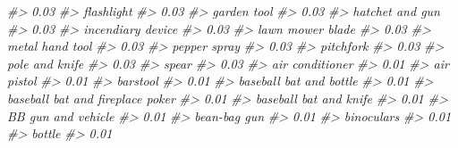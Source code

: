 \documentclass[
]{krantz}
\makeatletter
\newenvironment{Shaded}{\begin{snugshade}}{\end{snugshade}}
\newcommand{\CommentTok}[1]{\textcolor[rgb]{0.37,0.37,0.37}{\textit{#1}}}
\newenvironment{kframe}{%
\medskip{}
\setlength{\fboxsep}{.8em}
 \def\at@end@of@kframe{}%
 \ifinner\ifhmode%
  \def\at@end@of@kframe{\end{minipage}}%
  \begin{minipage}{\columnwidth}%
 \fi\fi%
 \def\FrameCommand##1{\hskip\@totalleftmargin \hskip-\fboxsep
 \colorbox{shadecolor}{##1}\hskip-\fboxsep
     \hskip-\linewidth \hskip-\@totalleftmargin \hskip\columnwidth}%
 \MakeFramed {\advance\hsize-\width
   \@totalleftmargin\z@ \linewidth\hsize
   \@setminipage}}%
 {\par\unskip\endMakeFramed%
 \at@end@of@kframe}
\renewenvironment{Shaded}{\begin{kframe}}{\end{kframe}}
\makeatother
\begin{document}
\begin{Shaded}
\begin{Highlighting}[]
\CommentTok{\#\textgreater{}                             0.03 }
\CommentTok{\#\textgreater{}                       flashlight }
\CommentTok{\#\textgreater{}                             0.03 }
\CommentTok{\#\textgreater{}                      garden tool }
\CommentTok{\#\textgreater{}                             0.03 }
\CommentTok{\#\textgreater{}                  hatchet and gun }
\CommentTok{\#\textgreater{}                             0.03 }
\CommentTok{\#\textgreater{}                incendiary device }
\CommentTok{\#\textgreater{}                             0.03 }
\CommentTok{\#\textgreater{}                 lawn mower blade }
\CommentTok{\#\textgreater{}                             0.03 }
\CommentTok{\#\textgreater{}                  metal hand tool }
\CommentTok{\#\textgreater{}                             0.03 }
\CommentTok{\#\textgreater{}                     pepper spray }
\CommentTok{\#\textgreater{}                             0.03 }
\CommentTok{\#\textgreater{}                        pitchfork }
\CommentTok{\#\textgreater{}                             0.03 }
\CommentTok{\#\textgreater{}                   pole and knife }
\CommentTok{\#\textgreater{}                             0.03 }
\CommentTok{\#\textgreater{}                            spear }
\CommentTok{\#\textgreater{}                             0.03 }
\CommentTok{\#\textgreater{}                  air conditioner }
\CommentTok{\#\textgreater{}                             0.01 }
\CommentTok{\#\textgreater{}                       air pistol }
\CommentTok{\#\textgreater{}                             0.01 }
\CommentTok{\#\textgreater{}                         barstool }
\CommentTok{\#\textgreater{}                             0.01 }
\CommentTok{\#\textgreater{}          baseball bat and bottle }
\CommentTok{\#\textgreater{}                             0.01 }
\CommentTok{\#\textgreater{} baseball bat and fireplace poker }
\CommentTok{\#\textgreater{}                             0.01 }
\CommentTok{\#\textgreater{}           baseball bat and knife }
\CommentTok{\#\textgreater{}                             0.01 }
\CommentTok{\#\textgreater{}               BB gun and vehicle }
\CommentTok{\#\textgreater{}                             0.01 }
\CommentTok{\#\textgreater{}                     bean{-}bag gun }
\CommentTok{\#\textgreater{}                             0.01 }
\CommentTok{\#\textgreater{}                       binoculars }
\CommentTok{\#\textgreater{}                             0.01 }
\CommentTok{\#\textgreater{}                           bottle }
\CommentTok{\#\textgreater{}                             0.01 }

\end{Highlighting}
\end{Shaded}
\end{document}

